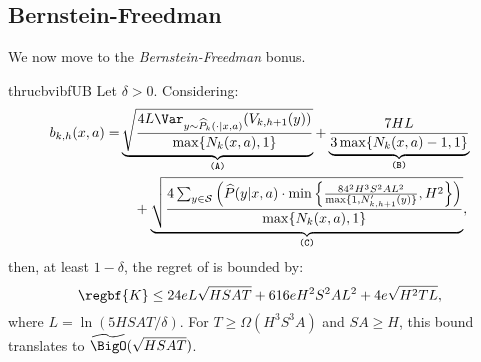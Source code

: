 \subsection{Bernstein-Freedman}
\label{sec:analysis:bf}

We now move to the \emph{Bernstein-Freedman} bonus.
\begin{restatable}{thr}{ucbvibfUB}\label{thr:ucbvibfUB}
Let $\delta > 0$. Considering:\footnotemark[2]  
\begin{align*}
    b_{k,h}(x,a) = & \underbrace{\sqrt{\frac{4L \Var_{y \sim \widehat{P}_k(\cdot | x,a)}(V_{k,h+1}(y))}{\max \{ N_{k}(x,a), 1 \}}}}_{\textup{\texttt{(A)}}} + \underbrace{\frac{7HL}{ 3 \max \{ N_{k}(x,a) - 1, 1 \}}}_{\textup{\texttt{(B)}}} \\ & \quad + \underbrace{\sqrt{\frac{4 \sum_{y \in \mathcal{S}} \left( \widehat{P}(y | x, a) \cdot \min \left\{ \frac{84^2 H^3 S^2 A L^2}{\max \{1, N_{k,h+1}'(y) \} } , H^2 \right\} \right)}{\max \{ N_{k}(x,a), 1 \}}}}_{\textup{\texttt{(C)}}},
\end{align*}
then, \wp at least $1-\delta$, the regret of \ucbvibf is bounded by:
\begin{equation*}
    \regbf{K} \le 24 e L \sqrt{HSAT} + 616 e H^2 S^2 A L^2 + 4 e \sqrt{H^2 TL},
\end{equation*}
where $L = \ln (5HSAT / \delta )$. For $T \ge \Omega ( H^3 S^3 A )$ and $SA \ge H$, this bound translates to $\widetilde{\BigO}(\sqrt{HSAT})$.
\end{restatable}

